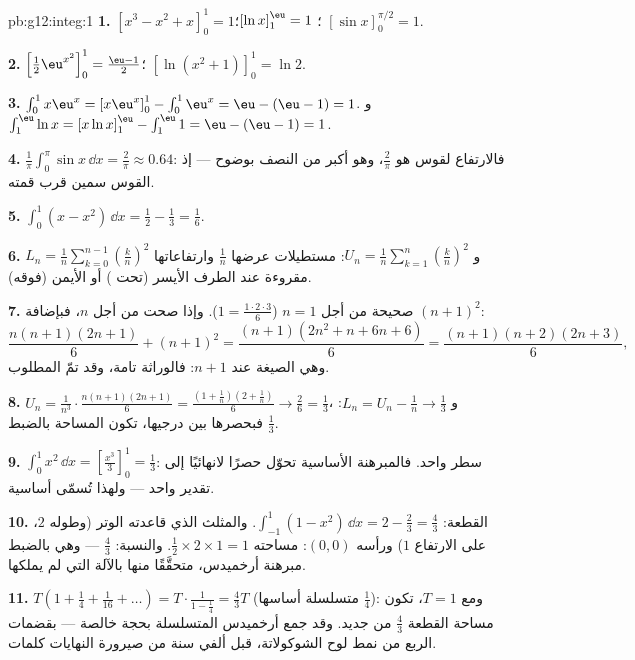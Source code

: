 \begin{solution}{pb:g12:integ:1}
\textbf{1.} $\left[x^3 - x^2 + x\right]_0^1 = 1$؛ \quad
$\left[\ln x\right]_1^{\eu} = 1$؛ \quad
$\left[\sin x\right]_0^{\pi/2} = 1$.

\textbf{2.} $\left[\frac12 \eu^{x^2}\right]_0^1 =
\frac{\eu - 1}{2}$؛ \quad
$\left[\ln(x^2 + 1)\right]_0^1 = \ln 2$.

\textbf{3.} $\int_0^1 x\eu^x = \left[x\eu^x\right]_0^1 -
\int_0^1 \eu^x = \eu - (\eu - 1) = 1$. و
$\int_1^{\eu} \ln x = \left[x\ln x\right]_1^{\eu} -
\int_1^{\eu} 1 = \eu - (\eu - 1) = 1$.

\textbf{4.} $\frac{1}{\pi}\int_0^\pi \sin x\,\dd x =
\frac{2}{\pi} \approx 0.64$: فالارتفاع  لقوس
 هو $\frac2\pi$، وهو أكبر من النصف بوضوح --- إذ
القوس سمين قرب قمته.

\textbf{5.} $\int_0^1 (x - x^2)\,\dd x = \frac12 - \frac13 =
\frac16$.

\textbf{6.} $L_n = \frac1n \sum_{k=0}^{n-1}
\left(\frac kn\right)^2$ و
$U_n = \frac1n \sum_{k=1}^{n} \left(\frac kn\right)^2$:
مستطيلات عرضها $\frac1n$ وارتفاعاتها مقروءة عند الطرف الأيسر
(تحت ) أو الأيمن (فوقه).

\textbf{7.} صحيحة من أجل $n = 1$ ($1 = \frac{1 \cdot 2 \cdot
3}{6}$). وإذا صحت من أجل $n$، فبإضافة $(n+1)^2$:
\[
\frac{n(n+1)(2n+1)}{6} + (n+1)^2
= \frac{(n+1)\left(2n^2 + n + 6n + 6\right)}{6}
= \frac{(n+1)(n+2)(2n+3)}{6},
\]
وهي الصيغة عند $n + 1$: فالوراثة تامة، وقد تمّ المطلوب.

\textbf{8.} $U_n = \frac{1}{n^3} \cdot
\frac{n(n+1)(2n+1)}{6} = \frac{(1 + \frac1n)(2 + \frac1n)}{6}
\to \frac26 = \frac13$، و $L_n = U_n - \frac1n \to \frac13$:
فبحصرها بين درجيها، تكون المساحة بالضبط
$\frac13$.

\textbf{9.} $\int_0^1 x^2\,\dd x =
\left[\frac{x^3}{3}\right]_0^1 = \frac13$: سطر واحد. فالمبرهنة
الأساسية تحوّل حصرًا لانهائيًا إلى تقدير واحد
 --- ولهذا تُسمّى
أساسية.

\textbf{10.} القطعة: $\int_{-1}^{1}(1 - x^2)\,\dd x =
2 - \frac23 = \frac43$. والمثلث الذي قاعدته الوتر (وطوله
$2$، على الارتفاع $1$) ورأسه $(0,0)$: مساحته
$\frac12 \times 2 \times 1 = 1$. والنسبة: $\frac43$ --- وهي بالضبط
مبرهنة أرخميدس، متحقَّقًا منها بالآلة التي لم يملكها.

\textbf{11.} $T\left(1 + \frac14 + \frac{1}{16} + \dots\right)
= T \cdot \frac{1}{1 - \frac14} = \frac43 T$ (متسلسلة 
أساسها $\frac14$): ومع $T = 1$، تكون مساحة القطعة
$\frac43$ من جديد. وقد جمع أرخميدس المتسلسلة بحجة
 خالصة --- بقضمات الربع من نمط لوح
الشوكولاتة، قبل ألفي سنة من صيرورة النهايات كلمات.


\end{solution}
